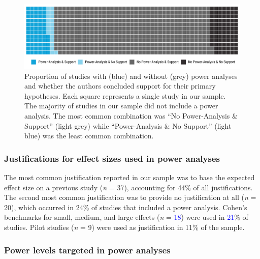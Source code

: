 \documentclass[
  man, donotrepeattitle,mask,floatsintext]{apa7}
\begin{document}
\begin{figure}

{\centering \includegraphics{../../figs/fig2} 

}

\caption{Proportion of studies with (blue) and without (grey) power analyses and whether the authors concluded support for their primary hypotheses. Each square represents a single study in our sample. The majority of studies in our sample did not include a power analysis. The most common combination was ``No Power-Analysis \& Support'' (light grey) while ``Power-Analysis \& No Support'' (light blue) was the least common combination.}\label{fig:fig2}
\end{figure}



\pagebreak

\hypertarget{justifications-for-effect-sizes-used-in-power-analyses}{%
\subsubsection{Justifications for effect sizes used in power analyses}\label{justifications-for-effect-sizes-used-in-power-analyses}}

The most common justification reported in our sample was to base the expected effect size on a previous study (\emph{n} = 37), accounting for 44\% of all justifications. The second most common justification was to provide no justification at all (\emph{n} = 20), which occurred in 24\% of studies that included a power analysis. Cohen's benchmarks for small, medium, and large effects (\emph{n} = \textcolor{blue}{18}) were used in \textcolor{blue}{21}\% of studies. Pilot studies (\emph{n} = 9) were used as justification in 11\% of the sample.

\hypertarget{power-levels-targeted-in-power-analyses}{%
\subsubsection{Power levels targeted in power analyses}\label{power-levels-targeted-in-power-analyses}}
\end{document}
